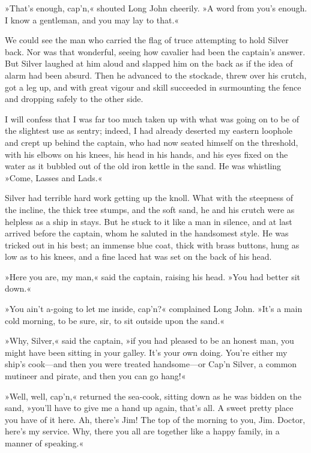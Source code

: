 »That's enough, cap'n,« shouted Long John cheerily. »A word from you's enough. I know a gentleman, and you may lay to that.«

We could see the man who carried the flag of truce attempting to hold Silver back. Nor was that wonderful, seeing how cavalier had been the captain's answer. But Silver laughed at him aloud and slapped him on the back as if the idea of alarm had been absurd. Then he advanced to the stockade, threw over his crutch, got a leg up, and with great vigour and skill succeeded in surmounting the fence and dropping safely to the other side.

I will confess that I was far too much taken up with what was going on to be of the slightest use as sentry; indeed, I had already deserted my eastern loophole and crept up behind the captain, who had now seated himself on the threshold, with his elbows on his knees, his head in his hands, and his eyes fixed on the water as it bubbled out of the old iron kettle in the sand. He was whistling »Come, Lasses and Lads.«

Silver had terrible hard work getting up the knoll. What with the steepness of the incline, the thick tree stumps, and the soft sand, he and his crutch were as helpless as a ship in stays. But he stuck to it like a man in silence, and at last arrived before the captain, whom he saluted in the handsomest style. He was tricked out in his best; an immense blue coat, thick with brass buttons, hung as low as to his knees, and a fine laced hat was set on the back of his head.

»Here you are, my man,« said the captain, raising his head. »You had better sit down.«

»You ain't a-going to let me inside, cap'n?« complained Long John. »It's a main cold morning, to be sure, sir, to sit outside upon the sand.«

»Why, Silver,« said the captain, »if you had pleased to be an honest man, you might have been sitting in your galley. It's your own doing. You're either my ship's cook—and then you were treated handsome—or Cap'n Silver, a common mutineer and pirate, and then you can go hang!«

»Well, well, cap'n,« returned the sea-cook, sitting down as he was bidden on the sand, »you'll have to give me a hand up again, that's all. A sweet pretty place you have of it here. Ah, there's Jim! The top of the morning to you, Jim. Doctor, here's my service. Why, there you all are together like a happy family, in a manner of speaking.«

